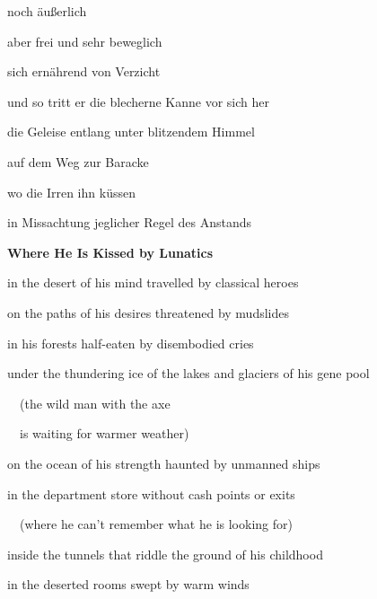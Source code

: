 noch äußerlich

aber frei und sehr beweglich

sich ernährend von Verzicht


\bigskip


\bigskip


\bigskip

und so tritt er die blecherne Kanne vor sich her

die Geleise entlang unter blitzendem Himmel

auf dem Weg zur Baracke


\bigskip

wo die Irren ihn küssen

in Missachtung jeglicher Regel des Anstands


\bigskip

\clearpage
\bigskip

{\bfseries
Where He Is Kissed by Lunatics}


\bigskip


\bigskip

in the desert of his mind travelled by classical heroes


\bigskip

on the paths of his desires threatened by mudslides


\bigskip

in his forests half-eaten by disembodied cries


\bigskip

under the thundering ice of the lakes and glaciers of his gene pool


\bigskip

\ \  (the wild man with the axe

\ \  is waiting for warmer weather)


\bigskip

on the ocean of his strength haunted by unmanned ships


\bigskip

in the department store without cash points or exits


\bigskip

\ \  (where he can't remember what he is looking for)


\bigskip

inside the tunnels that riddle the ground of his childhood 


\bigskip

in the deserted rooms swept by warm winds


\bigskip

